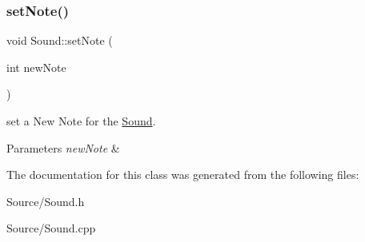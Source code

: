 \subsubsection{\texorpdfstring{setNote()}{setNote()}}
{\footnotesize\ttfamily void Sound\+::set\+Note (\begin{DoxyParamCaption}\item[{int}]{new\+Note }\end{DoxyParamCaption})}

set a New Note for the \mbox{\hyperlink{class_sound}{Sound}}. 
\begin{DoxyParams}{Parameters}
{\em new\+Note} & \\
\hline
\end{DoxyParams}


The documentation for this class was generated from the following files\+:\begin{DoxyCompactItemize}
\item 
Source/Sound.\+h\item 
Source/Sound.\+cpp\end{DoxyCompactItemize}
